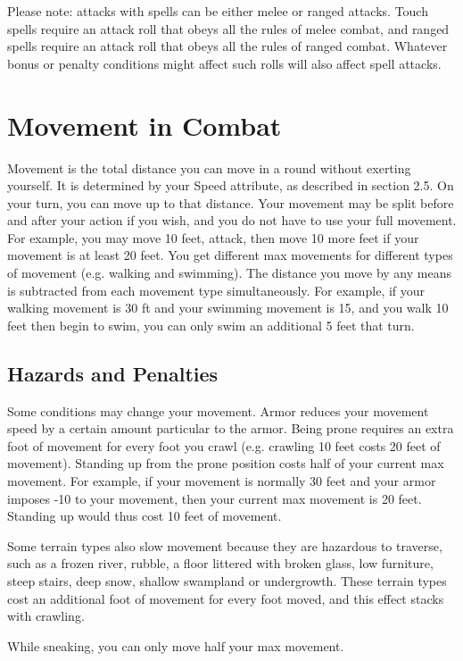 \documentclass[12pt]{book}
\begin{document}
Please note: attacks with spells can be either melee or ranged attacks. Touch spells require an attack roll that obeys all the rules of melee combat, and ranged spells require an attack roll that obeys all the rules of ranged combat. Whatever bonus or penalty conditions might affect such rolls will also affect spell attacks.

\section{Movement in Combat}

Movement is the total distance you can move in a round without exerting yourself. It is determined by your Speed attribute, as described in section 2.5. On your turn, you can move up to that distance. Your movement may be split before and after your action if you wish, and you do not have to use your full movement. For example, you may move 10 feet, attack, then move 10 more feet if your movement is at least 20 feet. You get different max movements for different types of movement (e.g. walking and swimming). The distance you move by any means is subtracted from each movement type simultaneously. For example, if your walking movement is 30 ft and your swimming movement is 15, and you walk 10 feet then begin to swim, you can only swim an additional 5 feet that turn.

\subsection{Hazards and Penalties}
Some conditions may change your movement. Armor reduces your movement speed by a certain amount particular to the armor. Being prone requires an extra foot of movement for every foot you crawl (e.g. crawling 10 feet costs 20 feet of movement). Standing up from the prone position costs half of your current max movement. For example, if your movement is normally 30 feet and your armor imposes -10 to your movement, then your current max movement is 20 feet. Standing up would thus cost 10 feet of movement.

Some terrain types also slow movement because they are hazardous to traverse, such as a frozen river, rubble, a floor littered with broken glass, low furniture, steep stairs, deep snow, shallow swampland or undergrowth. These terrain types cost an additional foot of movement for every foot moved, and this effect stacks with crawling.

While sneaking, you can only move half your max movement.
\end{document}
